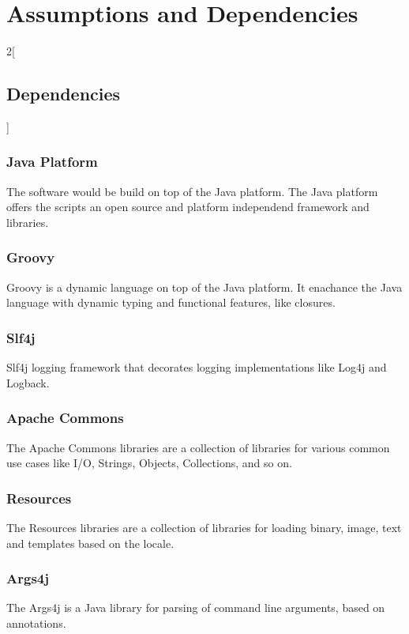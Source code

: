 \section{Assumptions and Dependencies}

\begin{multicols}{2}[\subsection{Dependencies}]
 
\subsubsection*{Java Platform}

The software would be build on top of the Java\cite{java13} platform. The Java platform
offers the scripts an open source and platform independend framework
and libraries.

\subsubsection*{Groovy}

Groovy\cite{groovy13}
is a dynamic language on top of the Java platform. It enachance the Java
language with dynamic typing and functional features, like closures.

\subsubsection*{Slf4j}

Slf4j\cite{slf4j13} logging framework that decorates logging implementations like 
Log4j\cite{log4j13} and Logback\cite{logback13}.

\subsubsection*{Apache Commons}

The Apache Commons\cite{commons13} libraries are a collection of libraries
for various common use cases like I/O, Strings, Objects, Collections, and so on.

\subsubsection*{Resources}

The Resources\cite{resources13} libraries are a collection of libraries
for loading binary, image, text and templates based on the locale.

\subsubsection*{Args4j}

The Args4j\cite{args4j13} is a Java library for parsing of command line arguments,
based on annotations.

\end{multicols}
